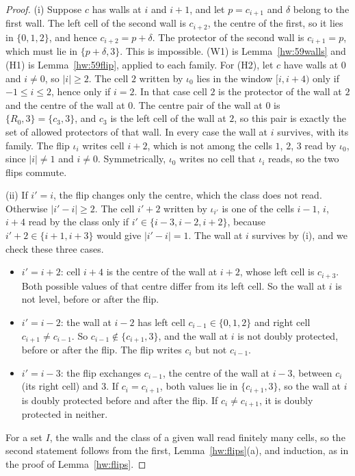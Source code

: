 \begin{proof}
(i) Suppose $c$ has walls at $i$ and $i+1$, and let $p=c_{i+1}$ and $\delta$ belong to the first wall. The left cell of the second wall is $c_{i+2}$, the centre of the first, so it lies in $\{0,1,2\}$, and hence $c_{i+2}=p+\delta$. The protector of the second wall is $c_{i+1}=p$, which must lie in $\{p+\delta,3\}$. This is impossible. (W1) is Lemma~\ref{hw:59walls} and (H1) is Lemma~\ref{hw:59flip}, applied to each family. For (H2), let $c$ have walls at $0$ and $i\ne0$, so $|i|\ge2$. The cell $2$ written by $\iota_0$ lies in the window $[i,i+4)$ only if $-1\le i\le2$, hence only if $i=2$. In that case cell $2$ is the protector of the wall at $2$ and the centre of the wall at $0$. The centre pair of the wall at $0$ is $\{R_0,3\}=\{c_3,3\}$, and $c_3$ is the left cell of the wall at $2$, so this pair is exactly the set of allowed protectors of that wall. In every case the wall at $i$ survives, with its family. The flip $\iota_i$ writes cell $i+2$, which is not among the cells $1$, $2$, $3$ read by $\iota_0$, since $|i|\ne1$ and $i\ne0$. Symmetrically, $\iota_0$ writes no cell that $\iota_i$ reads, so the two flips commute.

(ii) If $i'=i$, the flip changes only the centre, which the class does not read. Otherwise $|i'-i|\ge2$. The cell $i'+2$ written by $\iota_{i'}$ is one of the cells $i-1$, $i$, $i+4$ read by the class only if $i'\in\{i-3,i-2,i+2\}$, because $i'+2\in\{i+1,i+3\}$ would give $|i'-i|=1$. The wall at $i$ survives by (i), and we check these three cases.
\begin{itemize}
\item $i'=i+2$: cell $i+4$ is the centre of the wall at $i+2$, whose left cell is $c_{i+3}$. Both possible values of that centre differ from its left cell. So the wall at $i$ is not level, before or after the flip.
\item $i'=i-2$: the wall at $i-2$ has left cell $c_{i-1}\in\{0,1,2\}$ and right cell $c_{i+1}\ne c_{i-1}$. So $c_{i-1}\notin\{c_{i+1},3\}$, and the wall at $i$ is not doubly protected, before or after the flip. The flip writes $c_i$ but not $c_{i-1}$.
\item $i'=i-3$: the flip exchanges $c_{i-1}$, the centre of the wall at $i-3$, between $c_i$ (its right cell) and $3$. If $c_i=c_{i+1}$, both values lie in $\{c_{i+1},3\}$, so the wall at $i$ is doubly protected before and after the flip. If $c_i\ne c_{i+1}$, it is doubly protected in neither.
\end{itemize}
For a set $I$, the walls and the class of a given wall read finitely many cells, so the second statement follows from the first, Lemma~\ref{hw:flips}(a), and induction, as in the proof of Lemma~\ref{hw:flips}.


\end{proof}
